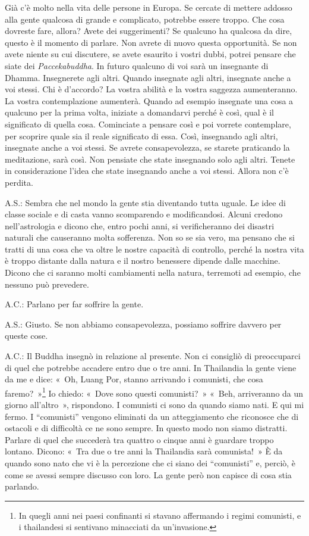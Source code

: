 Già c'è molto nella vita delle persone in Europa. Se cercate di mettere
addosso alla gente qualcosa di grande e complicato, potrebbe essere
troppo. Che cosa dovreste fare, allora? Avete dei suggerimenti? Se
qualcuno ha qualcosa da dire, questo è il momento di parlare. Non avrete
di nuovo questa opportunità. Se non avete niente su cui discutere, se
avete esaurito i vostri dubbi, potrei pensare che siate dei
\emph{Paccekabuddha}. In futuro qualcuno di voi sarà un insegnante di
Dhamma. Insegnerete agli altri. Quando insegnate agli altri, insegnate
anche a voi stessi. Chi è d'accordo? La vostra abilità e la vostra
saggezza aumenteranno. La vostra contemplazione aumenterà. Quando ad
esempio insegnate una cosa a qualcuno per la prima volta, iniziate a
domandarvi perché è così, qual è il significato di quella cosa.
Cominciate a pensare così e poi vorrete contemplare, per scoprire quale
sia il reale significato di essa. Così, insegnando agli altri, insegnate
anche a voi stessi. Se avrete consapevolezza, se starete praticando la
meditazione, sarà così. Non pensiate che state insegnando solo agli
altri. Tenete in considerazione l'idea che state insegnando anche a voi
stessi. Allora non c'è perdita.

A.S.: Sembra che nel mondo la gente stia diventando tutta uguale. Le
idee di classe sociale e di casta vanno scomparendo e modificandosi.
Alcuni credono nell'astrologia e dicono che, entro pochi anni, si
verificheranno dei disastri naturali che causeranno molta sofferenza.
Non so se sia vero, ma pensano che si tratti di una cosa che va oltre le
nostre capacità di controllo, perché la nostra vita è troppo distante
dalla natura e il nostro benessere dipende dalle macchine. Dicono che ci
saranno molti cambiamenti nella natura, terremoti ad esempio, che
nessuno può prevedere.

A.C.: Parlano per far soffrire la gente.

A.S.: Giusto. Se non abbiamo consapevolezza, possiamo soffrire davvero
per queste cose.

A.C.: Il Buddha insegnò in relazione al presente. Non ci consigliò di
preoccuparci di quel che potrebbe accadere entro due o tre anni. In
Thailandia la gente viene da me e dice: «~Oh, Luang Por, stanno
arrivando i comunisti, che cosa faremo?~»\footnote{In quegli anni nei
  paesi confinanti si stavano affermando i regimi comunisti, e i
  thailandesi si sentivano minacciati da un'invasione.} Io chiedo:
«~Dove sono questi comunisti?~» «~Beh, arriveranno da un giorno
all'altro~», rispondono. I comunisti ci sono da quando siamo nati. E qui
mi fermo. I ``comunisti'' vengono eliminati da un atteggiamento che
riconosce che di ostacoli e di difficoltà ce ne sono sempre. In questo
modo non siamo distratti. Parlare di quel che succederà tra quattro o
cinque anni è guardare troppo lontano. Dicono: «~Tra due o tre anni la
Thailandia sarà comunista!~» È da quando sono nato che vi è la
percezione che ci siano dei ``comunisti'' e, perciò, è come se avessi
sempre discusso con loro. La gente però non capisce di cosa stia
parlando.

